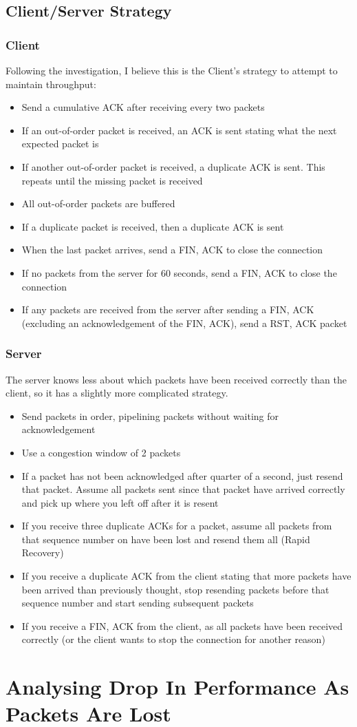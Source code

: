 \documentclass[12pt]{article}
\begin{document}
\subsection*{Client/Server Strategy}
\subsubsection*{Client}
Following the investigation, I believe this is the Client's strategy to attempt to maintain throughput:
\begin{itemize}
  \item Send a cumulative ACK after receiving every two packets
  \item If an out-of-order packet is received, an ACK is sent stating what the next expected packet is
  \item If another out-of-order packet is received, a duplicate ACK is sent. This repeats until the missing packet is received
  \item All out-of-order packets are buffered
  \item If a duplicate packet is received, then a duplicate ACK is sent
  \item When the last packet arrives, send a FIN, ACK to close the connection
  \item If no packets from the server for 60 seconds, send a FIN, ACK to close the connection
  \item If any packets are received from the server after sending a FIN, ACK (excluding an acknowledgement of the FIN, ACK), send a RST, ACK packet
\end{itemize}

\subsubsection*{Server}
The server knows less about which packets have been received correctly than the client, so it has a slightly more complicated strategy.
\begin{itemize}
  \item Send packets in order, pipelining packets without waiting for acknowledgement
  \item Use a congestion window of 2 packets
  \item If a packet has not been acknowledged after quarter of a second, just resend that packet. Assume all packets sent since that packet have arrived correctly and pick up where you left off after it is resent
  \item If you receive three duplicate ACKs for a packet, assume all packets from that sequence number on have been lost and resend them all (Rapid Recovery)
  \item If you receive a duplicate ACK from the client stating that more packets have been arrived than previously thought, stop resending packets before that sequence number and start sending subsequent packets
  \item If you receive a FIN, ACK from the client, as all packets have been received correctly (or the client wants to stop the connection for another reason)
\end{itemize}

\section{Analysing Drop In Performance As Packets Are Lost}
\end{document}
